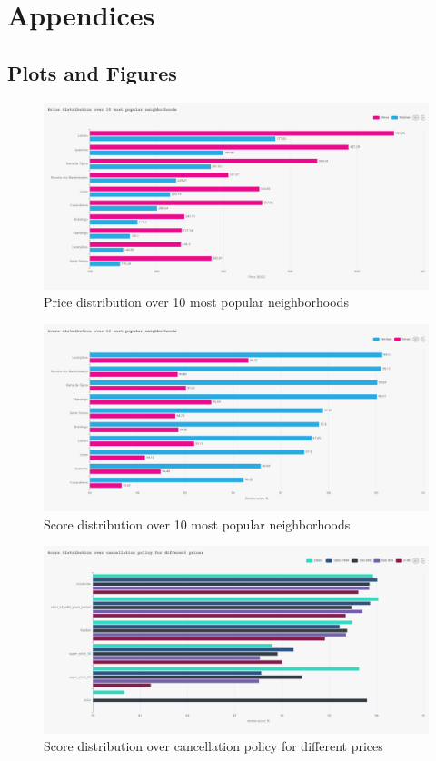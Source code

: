\section{Appendices}\label{chap:appendices}

\subsection{Plots and Figures}
\begin{figure}[H]
  \centering
  \includegraphics[width=1\textwidth]{images/q1_1.jpg}
  \caption{Price distribution over 10 most popular neighborhoods}\label{fig:q1_1}
\end{figure}

\begin{figure}[H]
  \centering
  \includegraphics[width=1\textwidth]{images/q1_2.jpg}
  \caption{Score distribution over 10 most popular neighborhoods}\label{fig:q1_2}
\end{figure}


\begin{figure}[H]
  \centering
  \includegraphics[width=1\textwidth]{images/q2_1.jpg}
  \caption{Score distribution over cancellation policy for different prices}\label{fig:q2_1}
\end{figure}

